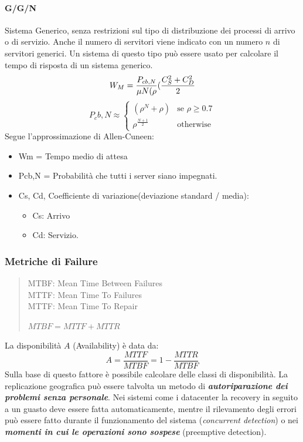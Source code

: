 \documentclass{article}
\begin{document}
			\paragraph{G/G/N}\label{ggn}
		Sistema Generico, senza restrizioni sul tipo di distribuzione dei
		processi di arrivo o di servizio. Anche il numero di servitori viene
		indicato con un numero \(n\) di servitori generici. Un sistema di questo
		tipo può essere usato per calcolare il tempo di risposta
		di un sistema generico.
		\[
		W_M = \frac{P_{cb,N}}{\mu N(\-\rho}(\frac{C^2_S+C^2_D}{2}
		\]
		\[
		P_cb,N \approx
		\begin{cases}
			(\rho^N+\rho) & \text{se $\rho \geq 0.7$}\\
			\rho^{\frac{N+1}{2}} & \text{otherwise}
		\end{cases}
		\]
		Segue l'approssimazione di Allen-Cuneen:
		\begin{itemize}
			\item Wm = Tempo medio di attesa
			\item Pcb,N = Probabilità che tutti i server siano impegnati.
			\item Cs, Cd, Coefficiente di variazione(deviazione standard / media):
			\begin{itemize}
				\item Cs: Arrivo
				\item Cd: Servizio.
			\end{itemize}
		\end{itemize}
		
		\subsubsection{Metriche di Failure}\label{metriche-di-failure}
		\begin{quote}
			MTBF: Mean Time Between Failures \\
			MTTF: Mean Time To Failures \\
			MTTF: Mean Time To Repair
			
			\(MTBF = MTTF + MTTR\)
		\end{quote}
		
		La disponibilità \(A\) (Availability) è data da: \[
		A = \frac{MTTF}{MTBF} = 1 - \frac{MTTR}{MTBF}
		\] Sulla base di questo fattore è possibile calcolare delle
		classi di disponibilità. La replicazione geografica
		può essere talvolta un metodo di \textbf{\emph{autoriparazione dei
				problemi senza personale}}. Nei sistemi come i datacenter la
		recovery in seguito a un guasto deve essere
		fatta automaticamente, mentre il
		rilevamento degli errori può essere fatto
		durante il funzionamento del sistema (\emph{concurrent
			detection}) o nei \textbf{\emph{momenti in cui le operazioni sono
				sospese}} (preemptive detection).
		
\end{document}
